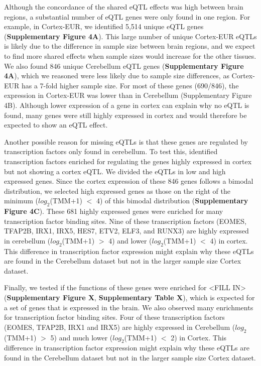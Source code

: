 Although the concordance of the shared eQTL effects was high between brain regions, a substantial number of eQTL genes were only found in one region. For example, in Cortex-EUR, we identified 5,514 unique eQTL genes (\textbf{Supplementary Figure 4A}). This large number of unique Cortex-EUR eQTLs is likely due to the difference in sample size between brain regions, and we expect to find more shared effects when sample sizes would increase for the other tissues. We also found 846 unique Cerebellum eQTL genes (\textbf{Supplementary Figure 4A}), which we reasoned were less likely due to sample size differences, as Cortex-EUR has a 7-fold higher sample size. For most of these genes (690/846), the expression in Cortex-EUR was lower than in Cerebellum (Supplementary Figure 4B). Although lower expression of a gene in cortex can explain why no eQTL is found, many genes were still highly expressed in cortex and would therefore be expected to show an eQTL effect.  

Another possible reason for missing eQTLs is that these genes are regulated by transcription factors only found in cerebellum. To test this, identified transcription factors enriched for regulating the genes highly expressed in cortex but not showing a cortex eQTL. We divided the eQTLs in low and high expressed genes. Since the cortex expression of these 846 genes follows a bimodal distribution, we selected high expressed genes as those on the right of the minimum ($log_2$(TMM+1) $<$ 4) of this bimodal distribution (\textbf{Supplementary Figure 4C}). These 681 highly expressed genes were enriched for many transcription factor binding sites. Nine of these transcription factors (EOMES, TFAP2B, IRX1, IRX5, HES7, ETV2, ELF3, and RUNX3) are highly expressed in cerebellum ($log_2$(TMM+1) $>$ 4) and lower ($log_2$(TMM+1) $<$ 4) in cortex. This difference in transcription factor expression might explain why these eQTLs are found in the Cerebellum dataset but not in the larger sample size Cortex dataset. 

Finally, we tested if the functions of these genes were enriched for <FILL IN> (\textbf{Supplementary Figure X}, \textbf{Supplementary Table X}), which is expected for a set of genes that is expressed in the brain. We also observed many enrichments for transcription factor binding sites. Four of these transcription factors (EOMES, TFAP2B, IRX1 and IRX5) are highly expressed in Cerebellum ($log_2$(TMM+1) $>$ 5) and much lower ($log_2$(TMM+1) $<$ 2) in Cortex. This difference in transcription factor expression might explain why these eQTLs are found in the Cerebellum dataset but not in the larger sample size Cortex dataset. 

